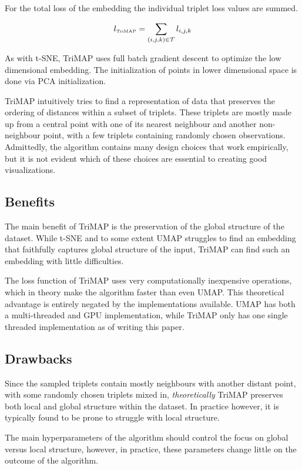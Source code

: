 For the total loss of the embedding the individual triplet loss values are summed.

\begin{equation}
	l_{\text{\tiny TriMAP}} = \sum_{(i,j,k)\in\mathcal{T}}l_{i,j,k}
\end{equation}

As with t-SNE, TriMAP uses full batch gradient descent to optimize the low dimensional embedding. The initialization of points in lower dimensional space is done via PCA initialization. 

TriMAP intuitively tries to find a representation of data that preserves the ordering of distances within a subset of triplets. These triplets are mostly made up from a central point with one of its nearest neighbour and another non-neighbour point, with a few triplets containing randomly chosen observations. Admittedly, the algorithm contains many design choices that work empirically, but it is not evident which of these choices are essential to creating good visualizations.

\subsection{Benefits}

The main benefit of TriMAP is the preservation of the global structure of the dataset. While t-SNE and to some extent UMAP struggles to find an embedding that faithfully captures global structure of the input, TriMAP can find such an embedding with little difficulties.

The loss function of TriMAP uses very computationally inexpensive operations, which in theory make the algorithm faster than even UMAP. This theoretical advantage is entirely negated by the implementations available. UMAP has both a multi-threaded and GPU implementation, while TriMAP only has one single threaded implementation as of writing this paper. 

\subsection{Drawbacks}

Since the sampled triplets contain mostly neighbours with another distant point, with some randomly chosen triplets mixed in, \textit{theoretically} TriMAP preserves both local and global structure within the dataset. In practice however, it is typically found to be prone to struggle with local structure.

The main hyperparameters of the algorithm should control the focus on global versus local structure, however, in practice, these parameters change little on the outcome of the algorithm.

